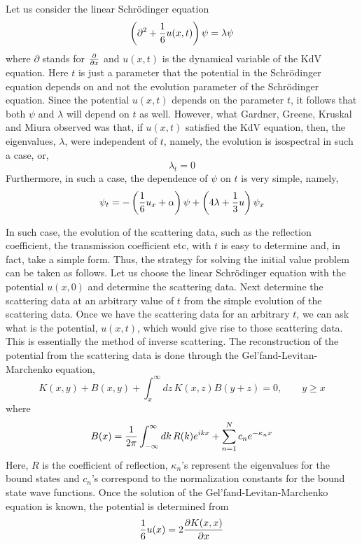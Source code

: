 \documentclass[a4paper,11pt]{article}
\begin{document}
Let us consider the linear Schr\"{o}dinger equation
\begin{equation}
\left(\partial^{2} + {1\over 6} u (x,t)\right) \psi = \lambda \psi
\end{equation}
where $\partial$ stands for ${\partial\over \partial x}$ and $u(x,t)$
is the dynamical variable of the KdV equation. Here $t$ is just a
parameter that the potential in the Schr\"{o}dinger equation depends
on and not the evolution parameter of the Schr\"{o}dinger
equation. Since the potential $u(x,t)$ depends on the parameter $t$,
it follows that both $\psi$ and $\lambda$ will depend on $t$ as
well. However, what Gardner, Greene, Kruskal and Miura observed was
that, if $u(x,t)$ satisfied the KdV equation, then, the eigenvalues,
$\lambda$, were independent of $t$, namely, the evolution is
isospectral in such a case, or,
\begin{equation}
\lambda_{t} = 0
\end{equation}
Furthermore, in such a case, the dependence of $\psi$ on $t$ is very
simple, namely,
\begin{equation}
\psi_{t} = - \left({1\over 6} u_{x} + \alpha\right) \psi +
\left(4\lambda + {1\over 3} u\right) \psi_{x}
\end{equation}

In such case, the evolution of the scattering data, such as the
reflection coefficient, the transmission coefficient etc, with $t$ is
easy to determine and, in fact, take a simple form. Thus, the strategy
for solving the initial value problem can be taken as follows. Let us
choose the linear Schr\"{o}dinger equation with the potential $u
(x,0)$ and determine the scattering data. Next determine the
scattering data at an arbitrary value of $t$ from the simple evolution
of the scattering data. Once we have the scattering data for an
arbitrary $t$, we can ask what is the potential, $u (x,t)$, which would give
rise to those scattering data. This is essentially the method of
inverse scattering. The reconstruction of the potential from the
scattering data is done through the Gel'fand-Levitan-Marchenko
equation,
\begin{equation}
K(x,y) + B(x,y) + \int_{x}^{\infty} dz\,K(x,z) B(y+z) = 0,\qquad y\geq
x
\end{equation}
where
\begin{equation}
B(x) = {1\over 2\pi} \int_{-\infty}^{\infty} dk\,R(k) e^{ikx} +
\sum_{n=1}^{N} c_{n} e^{-\kappa_{n} x}
\end{equation}
Here, $R$ is the coefficient of reflection, $\kappa_{n}$'s represent the
eigenvalues for the bound states and $c_{n}$'s correspond to the
normalization constants for the bound state wave functions. Once the
solution of the Gel'fand-Levitan-Marchenko equation is known, the
potential is determined from
\begin{equation}
{1\over 6} u(x) = 2 {\partial K(x,x)\over \partial x}
\end{equation}
\end{document}
